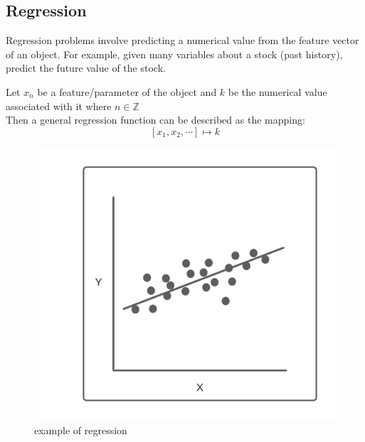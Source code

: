 \documentclass[10pt,a4paper]{report}
\begin{document}
			\subsection{Regression}
				Regression problems involve predicting a numerical value from the feature vector of an object.
				For example, given many variables about a stock (past history), predict the future value of the stock.\par
				Let $x_n$ be a feature/parameter of the object and $k$ be the numerical value associated with it where $n \in \mathbb{Z}$\\
				Then a general regression function can be described as the mapping: \[[x_1,x_2,\cdots] \mapsto k\]
				\begin{figure}[h]
					\centering
					\includegraphics[scale=0.7]{regression-diagram.png}
					\caption{example of regression}
					\label{fig:regression}
				\end{figure}
\end{document}

